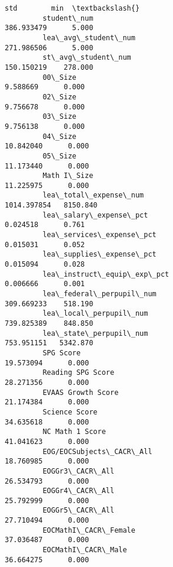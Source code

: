 \documentclass[11pt]{article}
\begin{document}
\begin{Verbatim}[commandchars=\\\{\}]
                                                                       std        min  \textbackslash{}
         student\_num                                            386.933479      5.000   
         lea\_avg\_student\_num                                    271.986506      5.000   
         st\_avg\_student\_num                                     150.150219    278.000   
         00\_Size                                                  9.588669      0.000   
         02\_Size                                                  9.756678      0.000   
         03\_Size                                                  9.756138      0.000   
         04\_Size                                                 10.842040      0.000   
         05\_Size                                                 11.173440      0.000   
         Math I\_Size                                             11.225975      0.000   
         lea\_total\_expense\_num                                 1014.397854   8150.840   
         lea\_salary\_expense\_pct                                   0.024518      0.761   
         lea\_services\_expense\_pct                                 0.015031      0.052   
         lea\_supplies\_expense\_pct                                 0.015094      0.028   
         lea\_instruct\_equip\_exp\_pct                               0.006666      0.001   
         lea\_federal\_perpupil\_num                               309.669233    518.190   
         lea\_local\_perpupil\_num                                 739.825389    848.850   
         lea\_state\_perpupil\_num                                 753.951151   5342.870   
         SPG Score                                               19.573094      0.000   
         Reading SPG Score                                       28.271356      0.000   
         EVAAS Growth Score                                      21.174384      0.000   
         Science Score                                           34.635618      0.000   
         NC Math 1 Score                                         41.041623      0.000   
         EOG/EOCSubjects\_CACR\_All                                18.760985      0.000   
         EOGGr3\_CACR\_All                                         26.534793      0.000   
         EOGGr4\_CACR\_All                                         25.792999      0.000   
         EOGGr5\_CACR\_All                                         27.710494      0.000   
         EOCMathI\_CACR\_Female                                    37.036487      0.000   
         EOCMathI\_CACR\_Male                                      36.664275      0.000   

\end{Verbatim}
\end{document}
